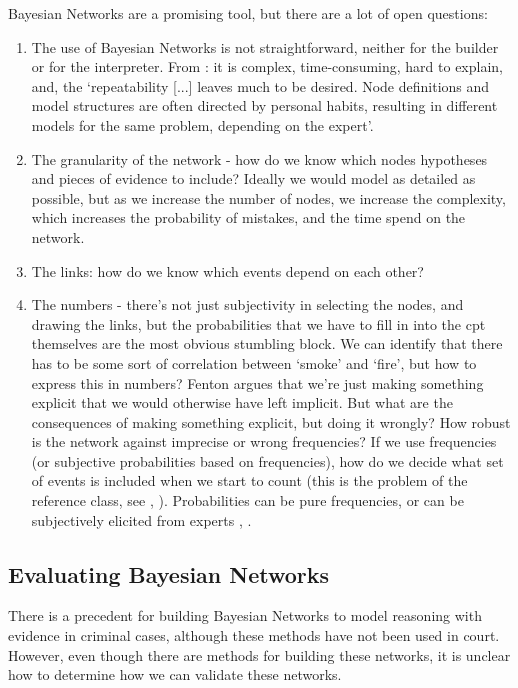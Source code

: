 Bayesian Networks are a promising tool, but there are a lot of open questions:
\begin{enumerate}
\item The use of Bayesian Networks is not straightforward, neither for the builder or for the interpreter. From \citet{deKoeijer2020}: it is complex, time-consuming, hard to explain, and, the `repeatability [...] leaves much to be desired. Node definitions and model structures are often directed by personal habits, resulting in different models for the same problem, depending on the expert'.
\item The granularity of the network - how do we know which nodes hypotheses and pieces of evidence to include? Ideally we would model as detailed as possible, but as we increase the number of nodes, we increase the complexity, which increases the probability of mistakes, and the time spend on the network.
\item The links: how do we know which events depend on each other?
\item The numbers - there's not just subjectivity in selecting the nodes, and drawing the links, but the probabilities that we have to fill in into the cpt themselves are the most obvious stumbling block. We can identify that there has to be some sort of correlation between `smoke' and `fire', but how to express this in numbers? Fenton argues that we're just making something explicit that we would otherwise have left implicit. But what are the consequences of making something explicit, but doing it wrongly? How robust is the network against imprecise or wrong frequencies? If we use frequencies (or subjective probabilities based on frequencies), how do we decide what set of events is included when we start to count (this is the problem of the reference class, see \citep{Allan2007}, \citep{colyvan2001}). Probabilities can be pure frequencies, or can be subjectively elicited from experts \citep{renooij2001}, \citep{Druzdzel2000}.
\end{enumerate}





\subsection{Evaluating Bayesian Networks}

There is a precedent for building Bayesian Networks to model reasoning with evidence in criminal cases, although these methods have not been used in court. However, even though there are methods for building these networks, it is unclear how to determine how we can validate these networks.

